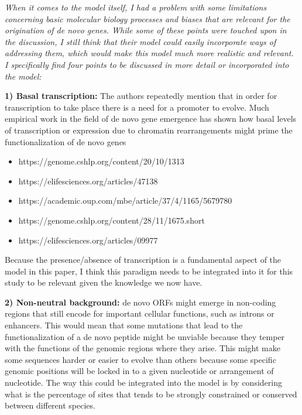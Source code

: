 \documentclass[12pt,a4paper]{article}
\begin{document}
{\itshape When it comes to the model itself, I had a problem with some limitations concerning basic molecular biology processes and biases that are relevant for the origination of de novo genes. While some of these points were touched upon in the discussion, I still think that their model could easily incorporate ways of addressing them, which would make this model much more realistic and relevant. I specifically find four points to be discussed in more detail or incorporated into the model:

\vspace{\baselineskip}

\textbf{1) Basal transcription:} The authors repeatedly mention that in order for transcription to take place there is a need for a promoter to evolve. Much empirical work in the field of de novo gene emergence has shown how basal levels of transcription or expression due to chromatin rearrangements might prime the functionalization of de novo genes 

\begin{itemize}\setlength{\itemsep}{-5pt}
\item https://genome.cshlp.org/content/20/10/1313
\item https://elifesciences.org/articles/47138
\item https://academic.oup.com/mbe/article/37/4/1165/5679780
\item https://genome.cshlp.org/content/28/11/1675.short
\item https://elifesciences.org/articles/09977
\end{itemize}

Because the presence/absence of transcription is a fundamental aspect of the model in this paper, I think this paradigm needs to be integrated into it for this study to be relevant given the knowledge we now have.
}

\vspace{\baselineskip}

\textbf{2) Non-neutral background:} de novo ORFs might emerge in non-coding regions that still encode for important cellular functions, such as introns or enhancers. This would mean that some mutations that lead to the functionalization of a de novo peptide might be unviable because they temper with the functions of the genomic regions where they arise. This might make some sequences harder or easier to evolve than others because some specific genomic positions will be locked in to a given nucleotide or arrangement of nucleotide. The way this could be integrated into the model is by considering what is the percentage of sites that tends to be strongly constrained or conserved between different species.
\end{document}
